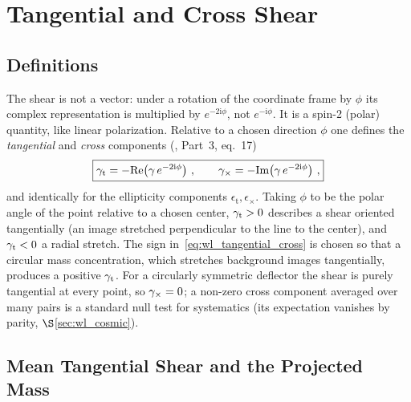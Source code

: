 \section{Tangential and Cross Shear}
\label{sec:wl_tangential}

\subsection{Definitions}

The shear is not a vector: under a rotation of the coordinate frame by
$\phi$ its complex representation is multiplied by $e^{-2\mathrm{i}\phi}$,
not $e^{-\mathrm{i}\phi}$.  It is a spin-2 (polar) quantity, like
linear polarization.  Relative to a chosen direction $\phi$ one defines
the \emph{tangential} and \emph{cross} components
(\citealp{schneider_kochanek_wambsganss_2006}, Part~3, eq.~17)
\begin{equation}
    \boxed{
    \gamma_{\mathrm t} = -\mathrm{Re}\!\left(\gamma\, e^{-2\mathrm{i}\phi}\right)\,,
    \qquad
    \gamma_\times = -\mathrm{Im}\!\left(\gamma\, e^{-2\mathrm{i}\phi}\right)\,,
    }
    \label{eq:wl_tangential_cross}
\end{equation}
and identically for the ellipticity components $\epsilon_{\mathrm t},
\epsilon_\times$.  Taking $\phi$ to be the polar angle of the point
relative to a chosen center, $\gamma_{\mathrm t} > 0$ describes a shear
oriented tangentially (an image stretched perpendicular to the
line to the center), and $\gamma_{\mathrm t} < 0$ a radial stretch.  The
sign in~\eqref{eq:wl_tangential_cross} is chosen so that a
circular mass concentration, which stretches background images
tangentially, produces a positive $\gamma_{\mathrm t}$.
For a circularly symmetric deflector the shear is purely tangential at
every point, so $\gamma_\times = 0$; a non-zero cross component averaged
over many pairs is a standard null test for systematics (its expectation
vanishes by parity, $\S$\ref{sec:wl_cosmic}).

\subsection{Mean Tangential Shear and the Projected Mass}

